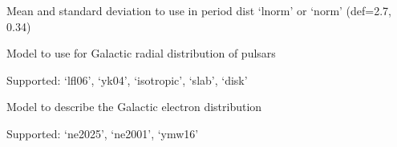 \documentclass[letterpaper,10pt,english]{sphinxmanual}
\begin{document}

\begin{fulllineitems}
\label{\detokenize{cmd-line-docs:cmdoption-populate.py-p}}
\pysigstartsignatures
\pysigline
{}
\pysigstopsignatures
\sphinxAtStartPar
Mean and standard deviation to use in period dist ‘lnorm’ or ‘norm’ (def=\sphinxhyphen{}2.7, 0.34)

\end{fulllineitems}


\begin{fulllineitems}
\label{\detokenize{cmd-line-docs:cmdoption-populate.py-rdist}}
\pysigstartsignatures
\pysigline
{}
\pysigstopsignatures
\sphinxAtStartPar
Model to use for Galactic radial distribution of pulsars

\sphinxAtStartPar
Supported: ‘lfl06’, ‘yk04’, ‘isotropic’, ‘slab’, ‘disk’

\end{fulllineitems}


\begin{fulllineitems}
\label{\detokenize{cmd-line-docs:cmdoption-populate.py-dm}}
\pysigstartsignatures
\pysigline
{}
\pysigstopsignatures
\sphinxAtStartPar
Model to describe the Galactic electron distribution

\sphinxAtStartPar
Supported: ‘ne2025’, ‘ne2001’, ‘ymw16’

\end{fulllineitems}
\end{document}
